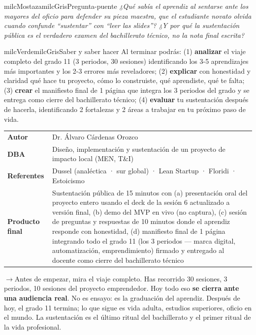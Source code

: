 \documentclass[11pt,letterpaper]{article}
\newcommand{\puente}[1]{%
  \begin{puentebox}%
    \textcolor{milcGradeDark}{$\rightarrow$}\hspace{2mm}#1%
  \end{puentebox}%
}
\begin{document}
\begin{softbox}{milcMostaza}{milcGris}{Pregunta-puente}
\textit{¿Qué sabía el aprendiz al sentarse ante los mayores del oficio para defender su pieza maestra, que el estudiante novato olvida cuando confunde \emph{``sustentar''} con \emph{``leer las slides''}? ¿Y por qué la sustentación pública es el verdadero examen del bachillerato técnico, no la nota final escrita?}
\end{softbox}

\begin{softbox}{milcVerde}{milcGris}{Saber y saber hacer}
Al terminar podrás: (1) \textbf{analizar} el viaje completo del grado 11 (3 periodos, 30 sesiones) identificando los 3-5 aprendizajes más importantes y los 2-3 errores más reveladores; (2) \textbf{explicar} con honestidad y claridad qué hace tu proyecto, cómo lo construiste, qué aprendiste, qué te falta; (3) \textbf{crear} el manifiesto final de 1 página que integra los 3 periodos del grado y se entrega como cierre del bachillerato técnico; (4) \textbf{evaluar} tu sustentación después de hacerla, identificando 2 fortalezas y 2 áreas a trabajar en tu próximo paso de vida.
\end{softbox}



\small
\begin{tabularx}{\textwidth}{>{\bfseries}p{3.0cm}Y}
Autor & Dr. Álvaro Cárdenas Orozco\\
DBA & Diseño, implementación y sustentación de un proyecto de impacto local (MEN, T\&I)\\
Referentes & Dussel (analéctica · sur global) · Lean Startup · Floridi · Estoicismo\\
Producto final & Sustentación pública de 15 minutos con (a) presentación oral del proyecto entero usando el deck de la sesión 6 actualizado a versión final, (b) demo del MVP en vivo (no captura), (c) sesión de preguntas y respuestas de 10 minutos donde el aprendiz responde con honestidad, (d) manifiesto final de 1 página integrando todo el grado 11 (los 3 periodos --- marca digital, automatización, emprendimiento) firmado y entregado al docente como cierre del bachillerato técnico\\
\end{tabularx}
\normalsize

\puente{Antes de empezar, mira el viaje completo. Has recorrido 30 sesiones, 3 periodos, 10 sesiones del proyecto emprendedor. Hoy todo eso \textbf{se cierra ante una audiencia real}. No es ensayo: es la graduación del aprendiz. Después de hoy, el grado 11 termina; lo que sigue es vida adulta, estudios superiores, oficio en el mundo. La sustentación es el último ritual del bachillerato y el primer ritual de la vida profesional.}
\end{document}
